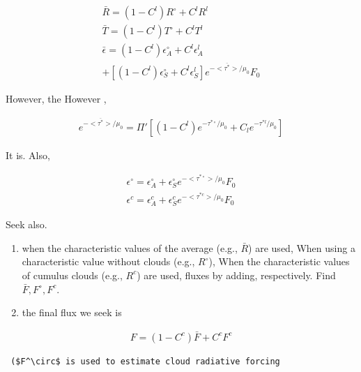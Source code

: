 \begin{eqnarray}
        \bar{R}  =  ( 1 - C^l ) R^\circ + C^l R^l \\
        \bar{T}  =  ( 1 - C^l ) T^\circ + C^l T^l \\
        \bar{\epsilon}  =  
            ( 1 - C^l ) \epsilon_A^\circ + C^l \epsilon_A^l \\        
           +  
            \left[ ( 1 - C^l ) \epsilon_S^\circ + C^l \epsilon_S^l \right] 
            e^{-\overline{<\tau^*>}/\mu_0} F_0 
\end{eqnarray}

However, the However ,

\begin{eqnarray}
        e^{-\overline{<\tau^*>}/\mu_0} 
        = \Pi' \left[ ( 1 - C^l ) e^{-\tau^{*\circ}/\mu_0} 
                       + C_l e^{-\tau^{*l}/\mu_0} \right]
\end{eqnarray}

It is. Also,

\begin{eqnarray}
        \epsilon^\circ  =  \epsilon_A^\circ +
                             \epsilon_S^\circ 
                              e^{-<\tau^{*\circ}>/\mu_0} F_0 \\
        \epsilon^c      =  \epsilon_A^c +
                             \epsilon_S^c 
                              e^{-<\tau^{*c}>/\mu_0} F_0        
\end{eqnarray}

Seek also.

\begin{enumerate}
\def\labelenumi{\arabic{enumi}.}
\setcounter{enumi}{3}
\item
  when the characteristic values of the average (e.g., \(\bar{R}\)) are
  used, When using a characteristic value without clouds (e.g.,
  \(R^\circ\)), When the characteristic values of cumulus clouds (e.g.,
  \(R^c\)) are used, fluxes by adding, respectively. Find
  \(\bar{F}, F^\circ, F^c\).
\item
  the final flux we seek is
\end{enumerate}

\begin{eqnarray}
        F = ( 1 - C^c ) \bar{F} + C^c F^c
\end{eqnarray}

\begin{verbatim}
 ($F^\circ$ is used to estimate cloud radiative forcing
\end{verbatim}

